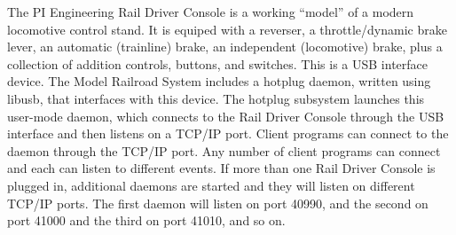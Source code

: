 The PI Engineering Rail Driver Console is a
working ``model'' of a modern locomotive control stand.  It is equiped
with a reverser, a throttle/dynamic brake lever, an automatic
(trainline) brake, an independent (locomotive) brake, plus a collection
of addition controls, buttons, and switches.  This is a USB interface
device.  The Model Railroad System includes a hotplug daemon, written using libusb, that interfaces with this
device.  The hotplug subsystem launches this user-mode
daemon, which connects to the Rail
Driver Console through the USB interface and then listens on a TCP/IP
port.  Client programs can connect to the daemon through the TCP/IP
port.  Any number of client programs can connect and each can listen to
different events.  If more than one Rail Driver Console is plugged in,
additional daemons are started and they will listen on different TCP/IP
ports. The first daemon will listen on port 40990, and the second on
port 41000 and the third on port 41010, and so on.

